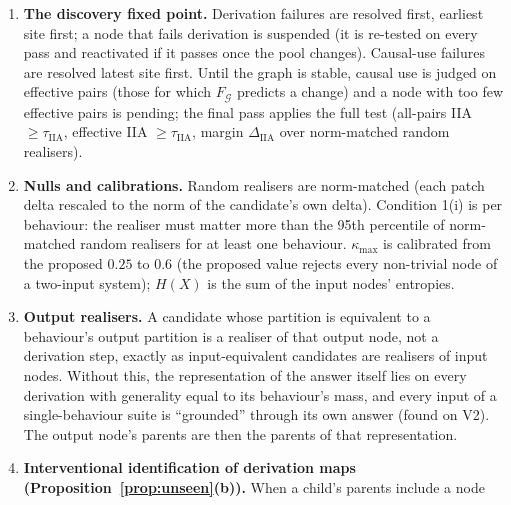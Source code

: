 \documentclass[11pt]{article}
\theoremstyle{definition}
\theoremstyle{plain}
\theoremstyle{remark}
\newcommand{\Hent}{H}
\newcommand{\G}{\mathcal{G}}
\newcommand{\IIA}{\mathrm{IIA}}
\begin{document}
\begin{enumerate}[label=(M\arabic*)]
realiser is proposed only if its value map decodes its label with 2-fold
held-out accuracy $\ge0.9$ (proposal confers nothing; the filter only saves
interventions).
(ii) A candidate whose realiser lies inside a larger candidate (or input
realiser) at the same site whose partition refines it is a
\emph{coarsening} and is not a separate node. (iii) A candidate covered by the
span of two or more smaller, pairwise \emph{separable} (state-level modular)
quotient-passing candidates is a \emph{composite} and is not a node.
(iv) Equivalent candidates are merged; interventions use the realiser at the
node's earliest surviving site with the lowest quotient defect; members at
other sites are bookkeeping.
\item \textbf{The discovery fixed point.} Derivation failures are resolved
first, earliest site first; a node that fails derivation is suspended (it is
re-tested on every pass and reactivated if it passes once the pool changes).
Causal-use failures are resolved latest site first. Until the graph is
stable, causal use is judged on effective pairs (those for which $F_{\G}$
predicts a change) and a node with too few effective pairs is pending; the
final pass applies the full test (all-pairs IIA $\ge\tau_{\IIA}$, effective
IIA $\ge\tau_{\IIA}$, margin $\Delta_{\IIA}$ over norm-matched random realisers).
\item \textbf{Nulls and calibrations.} Random realisers are norm-matched
(each patch delta rescaled to the norm of the candidate's own delta).
Condition 1(i) is per behaviour: the realiser must matter more than the 95th
percentile of norm-matched random realisers for at least one behaviour.
$\kappa_{\max}$ is calibrated from the proposed $0.25$ to $0.6$ (the proposed
value rejects every non-trivial node of a two-input system); $\Hent(X)$ is
the sum of the input nodes' entropies.
\item \textbf{Output realisers.} A candidate whose partition is equivalent to a
behaviour's output partition is a realiser of that output node, not a
derivation step, exactly as input-equivalent candidates are realisers of
input nodes. Without this, the representation of the answer itself lies on
every derivation with generality equal to its behaviour's mass, and every
input of a single-behaviour suite is ``grounded'' through its own answer
(found on V2). The output node's parents are then the parents of that
representation.
\item \textbf{Interventional identification of derivation maps
(Proposition~\ref{prop:unseen}(b)).} When a child's parents include a node

\end{enumerate}
\end{document}
